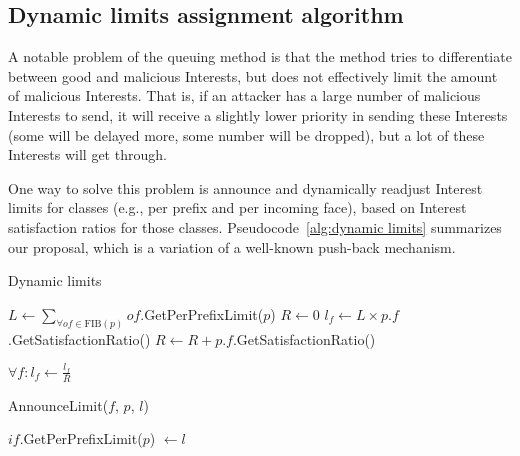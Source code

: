 
\subsection{Dynamic limits assignment algorithm}
\label{sec:dynamic limits}

A notable problem of the queuing method is that the method tries to differentiate between good and malicious Interests, but does not effectively limit the amount of malicious Interests.
That is, if an attacker has a large number of malicious Interests to send, it will receive a slightly lower priority in sending these Interests (some will be delayed more, some number will be dropped), but a lot of these Interests will get through.

One way to solve this problem is announce and dynamically readjust Interest limits for classes (e.g., per prefix and per incoming face), based on Interest satisfaction ratios for those classes. 
Pseudocode~\ref{alg:dynamic limits} summarizes our proposal, which is a variation of a well-known push-back mechanism.




\begin{algorithm}[h]
\caption{Dynamic limits}
\label{alg:dynamic limits}
\begin{algorithmic}[1]

 
    \State $L \leftarrow \displaystyle\sum\limits_{\mathrm{\forall \mathit{of} \in FIB(\mathit{p})}}{}{}of$.GetPerPrefixLimit($p$)
    \State $R \leftarrow 0$
        \State $l_f \leftarrow L \times p$.$f$.GetSatisfactionRatio()
        \State $R \leftarrow R + p$.$f$.GetSatisfactionRatio()
    \EndFor

     
        \State $\forall f : l_f \leftarrow \displaystyle\frac{l_f}{R}$ 
    \EndIf

        \State AnnounceLimit($f$, $p$, $l$)
\EndFor
\EndFunction

\vspace{0.2cm}

\State{} 
    \State $if$.GetPerPrefixLimit($p$) $\leftarrow l$ 
\EndFunction

\end{algorithmic}
\end{algorithm}

